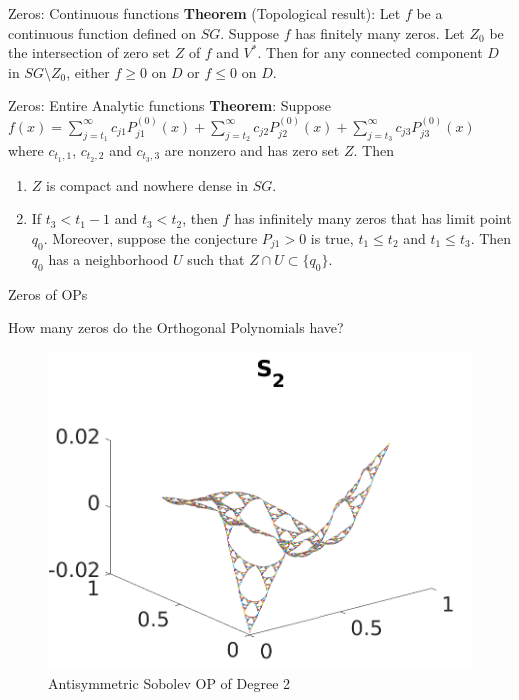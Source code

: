 \documentclass[xcolor = dvipsnames]{beamer}
\begin{document}
\begin{frame}{Zeros: Continuous functions}
    \textbf{Theorem} (Topological result): Let $f$ be a continuous function defined on $SG$. Suppose $f$ has finitely many zeros. Let $Z_0$ be the intersection of zero set $Z$ of $f$ and $V^*$. Then for any connected component $D$ in $SG\setminus Z_0$, either $f\ge0$ on $D$ or $f\le0$ on $D$.

\end{frame}
\begin{frame}{Zeros: Entire Analytic functions}
    \textbf{Theorem}: Suppose $f(x)=\sum\limits^\infty_{j=t_1}c_{j1}P_{j1}^{(0)}(x)+\sum\limits^\infty_{j=t_2}c_{j2}P_{j2}^{(0)}(x)+\sum\limits^\infty_{j=t_3}c_{j3}P_{j3}^{(0)}(x)$ where $c_{t_1,1}$, $c_{t_2,2}$ and $c_{t_3,3}$ are nonzero and has zero set $Z$. 
Then\begin{enumerate} \item$Z$ is compact and nowhere dense in $SG$. \pause
\item If $ t_3<t_1-1$ and $t_3<t_2$, then $f$ has infinitely many zeros that has limit point $q_0$. Moreover, suppose the conjecture $P_{j1}>0$ is true, $t_1\le t_2$ and $t_1\le t_3$. Then $q_0$ has a neighborhood $U$ such that $Z\cap U\subset\{q_0\}.$
\end{enumerate}

\end{frame}

\begin{frame}{Zeros of OPs}

How many zeros do the Orthogonal Polynomials have?


    \begin{figure}[H]
        \centering
        \includegraphics[width=0.7\linewidth]{images/H1AntisymOPs0_23/SAntiSym2.png}
        \caption{Antisymmetric Sobolev OP of Degree 2}
        \label{fig:S_5}
    \end{figure}
\end{frame}
\end{document}
